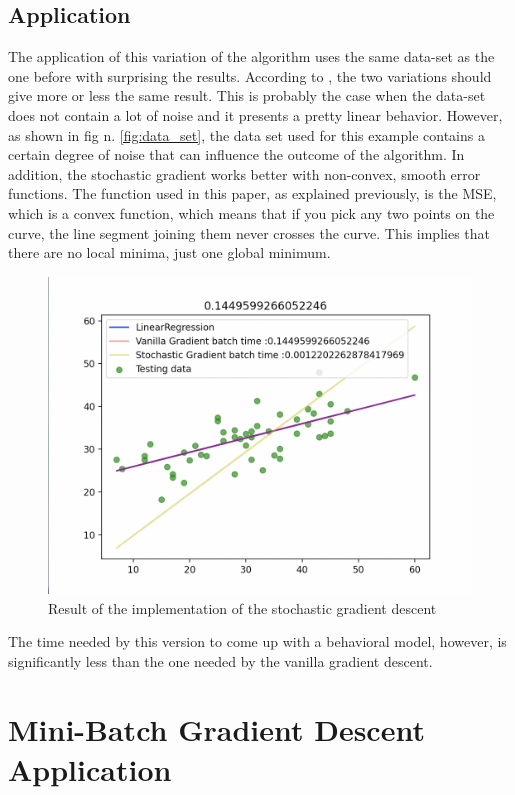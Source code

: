\documentclass[conference]{IEEEtran}
\begin{document}
\subsection{Application}
The application of this variation of the algorithm uses the same data-set as the one before with surprising the results. 
According to  \cite{Scikit-Learn},  the two variations should give more or less the same result. This is probably the case when the data-set does not contain a lot of noise and it presents a pretty linear behavior. However, as shown in fig n. \ref{fig:data_set}, the data set used for this example contains a certain degree of noise that can influence the outcome of the algorithm. 
In addition, the stochastic gradient works better with non-convex, smooth error functions. The function used in this paper, as explained previously, is the MSE, which is a convex function, which means that if you pick any two points on the curve, the line segment joining them never crosses the curve. This implies that there are no local minima, just one global minimum. \cite{Scikit-Learn}
\begin{figure}[htbp]
    \includegraphics[scale=0.35]{Schermata 2021-05-01 alle 18.53.24.png}
    \caption{Result of the implementation of the stochastic gradient descent}
    \label{fig:stoc_res}
\end{figure}

The time needed by this version to come up with a behavioral model, however, is significantly less than the one needed by the vanilla gradient descent. 




\section{Mini-Batch Gradient Descent Application}
\end{document}
